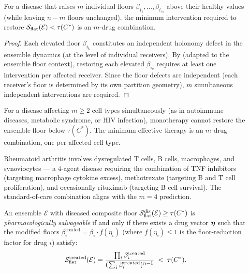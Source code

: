 \begin{proposition}
\label{prop:multi-agent-complexity}
For a disease that raises $m$ individual floors $\beta_{i_1}, \ldots,
\beta_{i_m}$ above their healthy values (while leaving $n - m$ floors
unchanged), the minimum intervention required to restore
$\mathcal{S}_{\mathrm{flat}}(\mathcal{E}) < \tau(C^*)$ is an $m$-drug combination.
\end{proposition}

\begin{proof}
Each elevated floor $\beta_{i_k}$ constitutes an independent holonomy defect
in the ensemble dynamics (at the level of individual receivers).  By
 (adapted to the ensemble floor context), restoring
each elevated $\beta_{i_k}$ requires at least one intervention per affected
receiver.  Since the floor defects are independent (each receiver's floor
is determined by its own partition geometry), $m$ simultaneous independent
interventions are required.
\end{proof}

\begin{corollary}
\label{cor:combination-necessary}
For a disease affecting $m \geq 2$ cell types simultaneously (as in
autoimmune diseases, metabolic syndrome, or HIV infection), monotherapy
cannot restore the ensemble floor below $\tau(C^*)$.  The minimum effective
therapy is an $m$-drug combination, one per affected cell type.
\end{corollary}

\begin{remark}
Rheumatoid arthritis involves dysregulated T cells, B cells, macrophages, and
synoviocytes — a 4-agent disease requiring the combination of TNF inhibitors
(targeting macrophage cytokine excess), methotrexate (targeting B and T cell
proliferation), and occasionally rituximab (targeting B cell survival).  The
standard-of-care combination aligns with the $m = 4$ prediction.
\end{remark}

\begin{theorem}
\label{thm:ensemble-salvageability}
An ensemble $\mathcal{E}$ with diseased composite floor
$\mathcal{S}_{\mathrm{flat}}^{\mathrm{dis}}(\mathcal{E}) \geq \tau(C^*)$ is
\emph{pharmacologically salvageable} if and only if there exists a drug
vector $\boldsymbol{\eta}$ such that the modified floors
$\beta_i^{\mathrm{treated}} = \beta_i \cdot f(\eta_i)$ (where $f(\eta_i) \leq 1$
is the floor-reduction factor for drug $i$) satisfy:
\[
  \mathcal{S}_{\mathrm{flat}}^{\mathrm{treated}}(\mathcal{E})
  = \frac{\prod_i \beta_i^{\mathrm{treated}}}
         {(\sum_i \beta_i^{\mathrm{treated}})^{n-1}}
  \;<\; \tau(C^*).
\]
\end{theorem}

